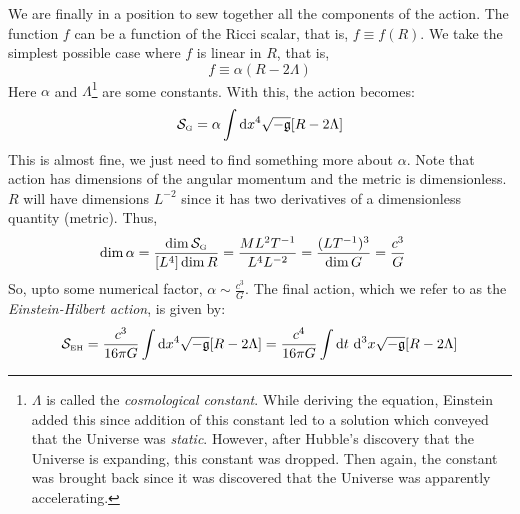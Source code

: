 We are finally in a position to sew together all the components of the action. The function $f$ can be a function of the Ricci scalar, that is, $f\equiv f(R)$. We take the simplest possible case where $f$ is linear in $R$, that is, 
$$f \equiv \alpha (R-2\Lambda)$$
Here $\alpha$ and $\Lambda$\footnote{$\Lambda$ is called the \textit{cosmological constant}. While deriving the equation, Einstein added this since addition of this constant led to a solution which conveyed that the Universe was \textit{static}. However, after Hubble's discovery that the Universe is expanding, this constant was dropped. Then again, the constant was brought back since it was discovered that the Universe was apparently accelerating. } are some constants. With this, the action becomes:
$$\mathcal S_{\text{\tiny G}} = \alpha \int \dd x^4 \sqrt{-\mathfrak{g}}[R- 2\Lambda]$$
This is almost fine, we just need to find something more about $\alpha$.  Note that action has dimensions of the angular momentum and the metric is dimensionless. $R$ will have dimensions $L^{-2}$ since it has two derivatives of a dimensionless quantity (metric). Thus, 
\begin{align*}
    \dim{\alpha} &= \frac{\dim{\mathcal S_{\text{\tiny G}}}}{[L^4] \dim{R}}=\frac{ML^2T^{-1}}{L^4 L^{-2}}=\frac{(LT^{-1})^3}{\dim{G}}=\frac{c^3}{G}
\end{align*}
So, upto some numerical factor, $\alpha\sim \frac{c^3}{G}$. The final action, which we refer to as the \textit{Einstein-Hilbert action}, is given by:
\begin{equation}\label{eqn:EHact}
    \mathcal S_{\text{\tiny EH}} = \frac{c^3}{16\pi G}\int \dd x^4 \sqrt{-\mathfrak{g}}[R- 2\Lambda] =\frac{c^4}{16\pi G}\int \dd t \ \dd^3 x \sqrt{-\mathfrak{g}}[R- 2\Lambda]
\end{equation}


